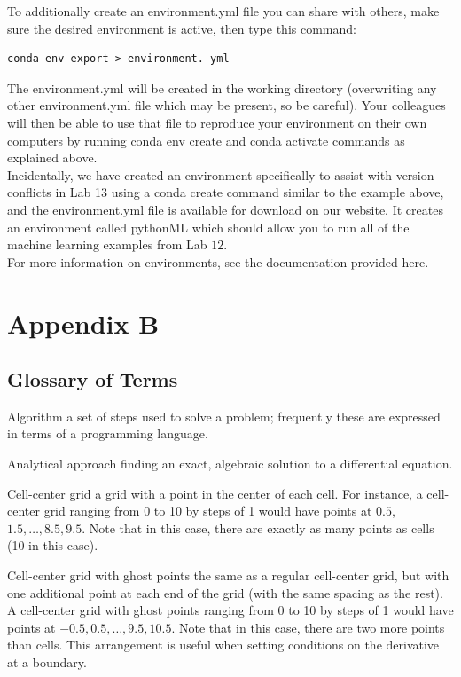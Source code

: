 \documentclass{book}
\theoremstyle{plain}
\theoremstyle{definition}
\numberwithin{exm}{chapter}
\theoremstyle{remark}
\theoremstyle{summary}
\theoremstyle{overview}
\begin{document}
To additionally create an environment.yml file you can share with others, make sure the desired environment is active, then type this command:\\

\begin{lstlisting}
conda env export > environment. yml
\end{lstlisting}
The environment.yml will be created in the working directory (overwriting any other environment.yml file which may be present, so be careful). Your colleagues will then be able to use that file to reproduce your environment on their own computers by running conda env create and conda activate commands as explained above.\\

Incidentally, we have created an environment specifically to assist with version conflicts in Lab 13 using a conda create command similar to the example above, and the environment.yml file is available for download on our website. It creates an environment called pythonML which should allow you to run all of the machine learning examples from Lab $12 .$\\

For more information on environments, see the documentation provided here.\\

\chapter*{Appendix B}
\section*{Glossary of Terms}

Algorithm a set of steps used to solve a problem; frequently these are expressed in terms of a programming language.

Analytical approach finding an exact, algebraic solution to a differential equation.

Cell-center grid a grid with a point in the center of each cell. For instance, a cell-center grid ranging from 0 to 10 by steps of 1 would have points at $0.5$, $1.5, \ldots, 8.5,9.5$. Note that in this case, there are exactly as many points as cells (10 in this case).

Cell-center grid with ghost points the same as a regular cell-center grid, but with one additional point at each end of the grid (with the same spacing as the rest). A cell-center grid with ghost points ranging from 0 to 10 by steps of 1 would have points at $-0.5,0.5, \ldots, 9.5,10.5$. Note that in this case, there are two more points than cells. This arrangement is useful when setting conditions on the derivative at a boundary.
\end{document}
